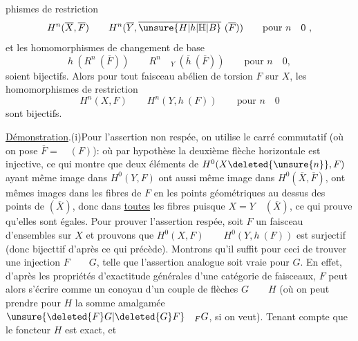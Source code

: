 
phismes de restriction
\[
H^n(\overline{X},\overline{F})\qquad H^n(\overline{Y},\overline{\unsure{H|h|\mathbb{H}|B}}\ (\overline{F}))\qquad\text{pour }n\quad0\ ,
\]
et les homomorphismes de changement de base
\[
h\ (R^n\ (\overline{F}))\qquad R^n\quad{}_{Y}\ (\overline{h}\ (\overline{F}))\qquad\text{pour }n\quad0,
\]
soient bijectifs. Alors pour tout faisceau abélien de torsion $F$ sur $X$, les homomorphismes de restriction
\[
H^n(X,F)\qquad H^n(Y,h\ (F))\qquad\text{pour }n\quad0
\]
sont  bijectifs.

\uline{Démonstration}.\quad (i)\quad Pour l'assertion non respée, on utilise le carré commutatif (où on pose $\overline{F}=\quad(F)$):
où par hypothèse la deuxième flèche horizontale est injective, ce qui montre que deux éléments de $H^0(X\deleted{\unsure{n}},F)$ ayant même image dans $H^0(Y,F)$ ont aussi même image dans $H^0(\overline{X},\overline{F})$,  ont mêmes images dans les fibres  de $F$ en les points géométriques au dessus des points de $(\overline{X})$, donc dans \uline{toutes} les fibres puisque $X=Y\quad(\overline{X})$, ce qui prouve qu'elles sont égales. Pour prouver l'assertion respée, soit $F$ un faisceau d'ensembles sur $X$ et prouvons que $H^0(X,F)\qquad H^0(Y,h\ (F))$ est surjectif (donc bijecttif d'après ce qui précède). Montrons qu'il suffit pour ceci de trouver une injection $F\qquad G$, telle que l'assertion analogue soit vraie pour $G$. En effet, d'après les propriétés d'exactitude générales d'une catégorie de faisceaux, $F$ peut alors s'écrire comme un conoyau d'un couple de flèches $G\qquad H$ (où on peut prendre pour $H$ la somme amalgamée $\unsure{\deleted{F}G|\deleted{G}F}\quad{}_{F}G$, si on veut). Tenant compte que le foncteur $H$ est exact,  et
